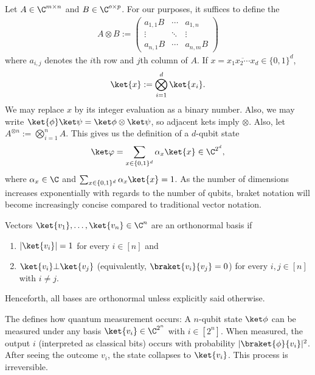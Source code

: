 \begin{definition}
Let $A \in \C^{m \times n}$ and $B \in \C^{o \times p}$. For our purposes, it suffices to define the 
\begin{align}
    A \otimes B := \begin{pmatrix}
        a_{1,1}B & \cdots & a_{1,n} \\
        \vdots & \ddots & \vdots \\
        a_{n,1}B & \cdots & a_{n,m}B
    \end{pmatrix}
\end{align}
where $a_{i,j}$ denotes the $i$th row and $j$th column of $A$. If $x = \overline{x_1 x_2 \cdots x_d} \in \{0,1\}^d$,
\begin{align}
    \ket{x} := \bigotimes_{i=1}^d \ket{x_i}.
\end{align}
We may replace $x$ by its integer evaluation as a binary number. Also, we may write $\ket{\phi} \ket\psi = \ket\phi \otimes \ket\psi$, so adjacent kets imply $\otimes$. Also, let $A^{\otimes n} := \bigotimes_{i=1}^n A$. This gives us the definition of a $d$-qubit state
\begin{align}
    \ket\varphi = \sum_{x \in \{0,1\}^d} \alpha_x \ket{x} \in \C^{2^d},
\end{align}
where $\alpha_x \in \C$ and $\sum_{x \in \{0,1\}^d} \alpha_x \ket{x} = 1$. As the number of dimensions increases exponentially with regards to the number of qubits, braket notation will become increasingly concise compared to traditional vector notation.
\end{definition}

\begin{definition} Vectors $\ket{v_1}, \ldots, \ket{v_n} \in \C^n$ are an orthonormal basis if
\begin{enumerate}
    \item $|\ket{v_i}| = 1$ for every $i \in [n]$ and
    \item $\ket{v_i} \bot \ket{v_j}$ (equivalently, $\braket{v_i}{v_j} = 0$) for every $i,j \in [n]$ with $i \neq j$.
\end{enumerate}
Henceforth, all bases are orthonormal unless explicitly said otherwise.
\end{definition}

\begin{definition} 
The  defines how quantum measurement occurs: A $n$-qubit state $\ket\phi$ can be measured under any basis $\ket{v_i} \in \C^{2^n}$ with $i \in [2^n]$. When measured, the output $i$ (interpreted as classical bits) occurs with probability $| \braket{\phi}{v_i} |^2$. After seeing the outcome $v_i$, the state collapses to $\ket{v_i}$. This process is irreversible.
\end{definition}

